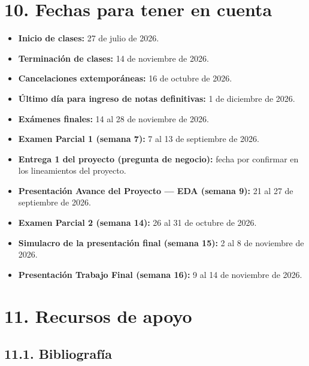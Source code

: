 \documentclass[11pt,a4paper]{article}
\begin{document}
\section*{10. Fechas para tener en cuenta}

\begin{itemize}
    \item \textbf{Inicio de clases:} 27 de julio de 2026.
    \item \textbf{Terminación de clases:} 14 de noviembre de 2026.
    \item \textbf{Cancelaciones extemporáneas:} 16 de octubre de 2026.
    \item \textbf{Último día para ingreso de notas definitivas:} 1 de diciembre de 2026.
    \item \textbf{Exámenes finales:} 14 al 28 de noviembre de 2026.
    \item \textbf{Examen Parcial 1 (semana 7):} 7 al 13 de septiembre de 2026.
    \item \textbf{Entrega 1 del proyecto (pregunta de negocio):} fecha por confirmar en los lineamientos del proyecto.
    \item \textbf{Presentación Avance del Proyecto --- EDA (semana 9):} 21 al 27 de septiembre de 2026.
    \item \textbf{Examen Parcial 2 (semana 14):} 26 al 31 de octubre de 2026.
    \item \textbf{Simulacro de la presentación final (semana 15):} 2 al 8 de noviembre de 2026.
    \item \textbf{Presentación Trabajo Final (semana 16):} 9 al 14 de noviembre de 2026.
\end{itemize}

\section*{11. Recursos de apoyo}

\subsection*{11.1. Bibliografía}
\end{document}
